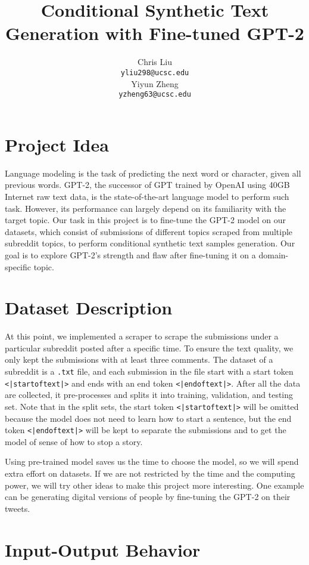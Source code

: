 \documentclass[10pt]{article}
\title{Conditional Synthetic Text Generation with Fine-tuned GPT-2}
\author{
 Chris Liu \\
    \texttt{yliu298@ucsc.edu} \\
 \And
 Yiyun Zheng \\
    \texttt{yzheng63@ucsc.edu}
}
\date{}
\begin{document}
\maketitle
\section{Project Idea}

Language modeling is the task of predicting the next word or character, given all previous words. GPT-2, the successor of GPT \cite{radford2018improving} trained by OpenAI \cite{radford2019language} using 40GB Internet raw text data, is the state-of-the-art language model to perform such task. However, its performance can largely depend on its familiarity with the target topic. Our task in this project is to fine-tune the GPT-2 model on our datasets, which consist of submissions of different topics scraped from multiple subreddit topics, to perform conditional synthetic text samples generation. Our goal is to explore GPT-2's strength and flaw after fine-tuning it on a domain-specific topic.

\section{Dataset Description}

At this point, we implemented a scraper to scrape the submissions under a particular subreddit posted after a specific time. To ensure the text quality, we only kept the submissions with at least three comments. The dataset of a subreddit is a \texttt{.txt} file, and each submission in the file start with a start token \texttt{<|startoftext|>} and ends with an end token \texttt{<|endoftext|>}. After all the data are collected, it pre-processes and splits it into training, validation, and testing set. Note that in the split sets, the start token \texttt{<|startoftext|>} will be omitted because the model does not need to learn how to start a sentence, but the end token \texttt{<|endoftext|>} will be kept to separate the submissions and to get the model of sense of how to stop a story.

Using pre-trained model saves us the time to choose the model, so we will spend extra effort on datasets. If we are not restricted by the time and the computing power, we will try other ideas to make this project more interesting. One example can be generating digital versions of people by fine-tuning the GPT-2 on their tweets.

\section{Input-Output Behavior}
\end{document}
